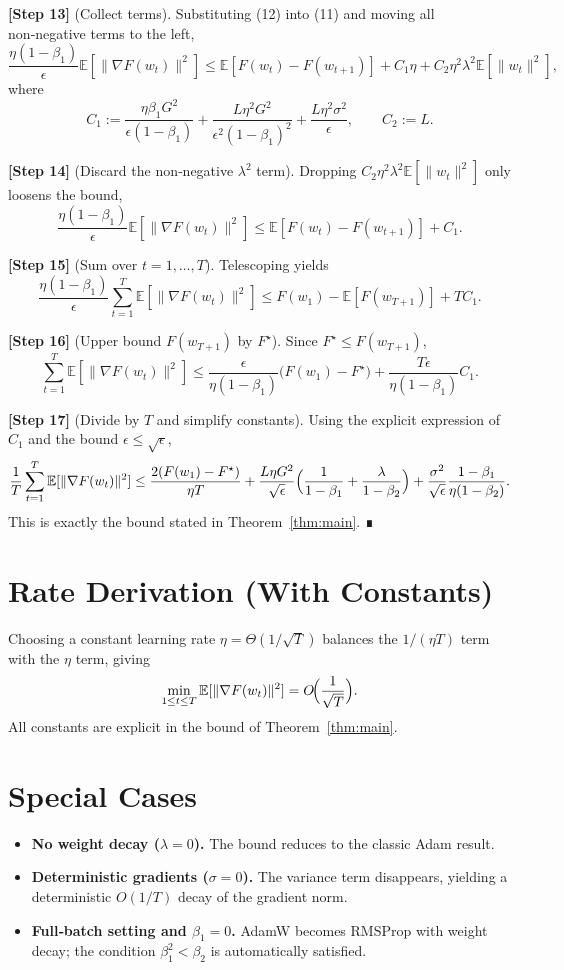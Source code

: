\documentclass{article}
\newcommand{\E}{\mathbb{E}}
\begin{document}
\noindent\textbf{[Step 13]} (Collect terms). Substituting (12) into (11) and moving all non‑negative terms to the left,
\[
\frac{\eta(1-\beta_1)}{\epsilon}\E[\|\nabla F(w_t)\|^2]
\le \E[F(w_t)-F(w_{t+1})]
+ C_1\eta + C_2\eta^2\lambda^2\E[\|w_t\|^2] ,
\tag{13}
\]
where
\[
C_1:=\frac{\eta\beta_1 G^2}{\epsilon(1-\beta_1)}+\frac{L\eta^2 G^2}{\epsilon^2(1-\beta_1)^2}+\frac{L\eta^2\sigma^2}{\epsilon},
\qquad
C_2:=L .
\]

\noindent\textbf{[Step 14]} (Discard the non‑negative $\lambda^2$ term). Dropping $C_2\eta^2\lambda^2\E[\|w_t\|^2]$ only loosens the bound,
\[
\frac{\eta(1-\beta_1)}{\epsilon}\E[\|\nabla F(w_t)\|^2]
\le \E[F(w_t)-F(w_{t+1})] + C_1 .
\tag{14}
\]

\noindent\textbf{[Step 15]} (Sum over $t=1,\dots,T$). Telescoping yields
\[
\frac{\eta(1-\beta_1)}{\epsilon}\sum_{t=1}^T\E[\|\nabla F(w_t)\|^2]
\le F(w_1)-\E[F(w_{T+1})] + T C_1 .
\tag{15}
\]

\noindent\textbf{[Step 16]} (Upper bound $F(w_{T+1})$ by $F^\star$). Since $F^\star\le F(w_{T+1})$,
\[
\sum_{t=1}^T\E[\|\nabla F(w_t)\|^2]
\le \frac{\epsilon}{\eta(1-\beta_1)}\bigl(F(w_1)-F^\star\bigr)
+ \frac{T\epsilon}{\eta(1-\beta_1)} C_1 .
\tag{16}
\]

\noindent\textbf{[Step 17]} (Divide by $T$ and simplify constants). Using the explicit expression of $C_1$ and the bound $\epsilon\le \sqrt{\epsilon}$,
\[
\frac1T\sum_{t=1}^T\E[\|\nabla F(w_t)\|^2]
\le
\frac{2(F(w_1)-F^\star)}{\eta T}
+ \frac{L\eta G^2}{\sqrt{\epsilon}}\Bigl(\frac{1}{1-\beta_1}+\frac{\lambda}{1-\beta_2}\Bigr)
+ \frac{\sigma^2}{\sqrt{\epsilon}}\frac{1-\beta_1}{\eta(1-\beta_2)} .
\]
This is exactly the bound stated in Theorem~\ref{thm:main}. ∎

\section*{Rate Derivation (With Constants)}
Choosing a constant learning rate $\eta = \Theta(1/\sqrt{T})$ balances the $1/(\eta T)$ term with the $\eta$ term, giving
\[
\min_{1\le t\le T}\E[\|\nabla F(w_t)\|^2]=O\!\Bigl(\frac{1}{\sqrt{T}}\Bigr).
\]
All constants are explicit in the bound of Theorem~\ref{thm:main}.

\section*{Special Cases}
\begin{itemize}
\item \textbf{No weight decay ($\lambda=0$).} The bound reduces to the classic Adam result.
\item \textbf{Deterministic gradients ($\sigma=0$).} The variance term disappears, yielding a deterministic $O(1/T)$ decay of the gradient norm.
\item \textbf{Full‑batch setting and $\beta_1=0$.} AdamW becomes RMSProp with weight decay; the condition $\beta_1^2<\beta_2$ is automatically satisfied.
\end{itemize}
\end{document}
